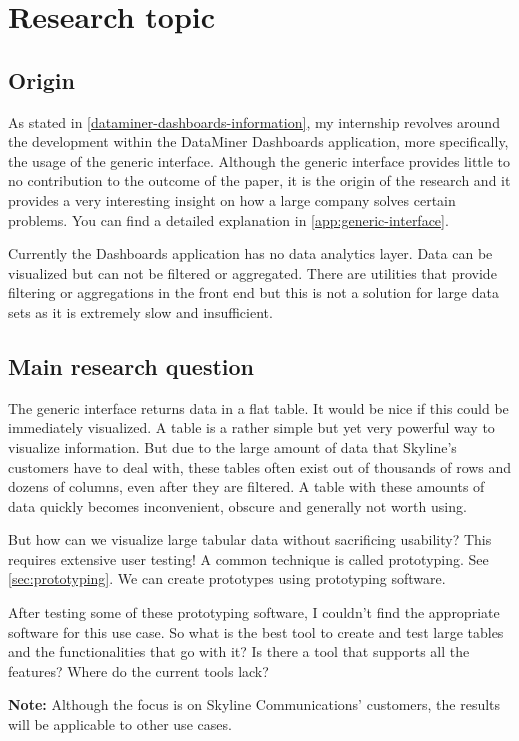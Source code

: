 \chapter{Research topic}

\section{Origin}
As stated in \autoref{dataminer-dashboards-information}, my internship revolves around the development within the DataMiner Dashboards application, more specifically, the usage of the generic interface. Although the generic interface provides little to no contribution to the outcome of the paper, it is the origin of the research and it provides a very interesting insight on how a large company solves certain problems. You can find a detailed explanation in \autoref{app:generic-interface}.

Currently the Dashboards application has no data analytics layer. Data can be visualized but can not be filtered or aggregated. There are utilities that provide filtering or aggregations in the front end but this is not a solution for large data sets as it is extremely slow and insufficient.
  
\section{Main research question}
The generic interface returns data in a flat table. It would be nice if this could be immediately visualized. A table is a rather simple but yet very powerful way to visualize information. But due to the large amount of data that Skyline's customers have to deal with, these tables often exist out of thousands of rows and dozens of columns, even after they are filtered. A table with these amounts of data quickly becomes inconvenient, obscure and generally not worth using. 

But how can we visualize large tabular data without sacrificing usability? This requires extensive user testing! A common technique is called prototyping. See \autoref{sec:prototyping}. We can create prototypes using prototyping software. 

After testing some of these prototyping software, I couldn't find the appropriate software for this use case. So what is the best tool to create and test large tables and the functionalities that go with it? Is there a tool that supports all the features? Where do the current tools lack?

\textbf{Note:} Although the focus is on Skyline Communications' customers, the results will be applicable to other use cases.
